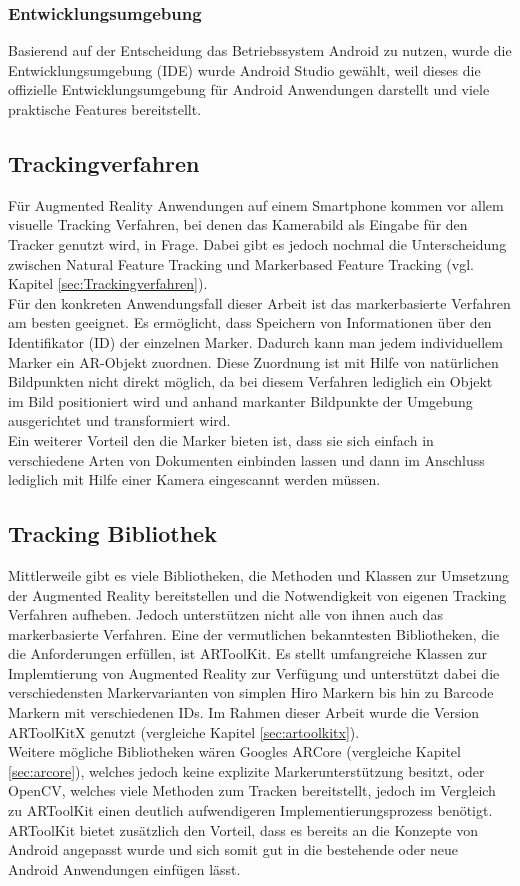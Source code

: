 \subsubsection{Entwicklungsumgebung}
Basierend auf der Entscheidung das Betriebssystem Android zu nutzen, wurde die Entwicklungsumgebung (IDE) wurde Android Studio gewählt, weil dieses die offizielle Entwicklungsumgebung für Android Anwendungen darstellt und viele praktische Features bereitstellt. 

\subsection{Trackingverfahren}
Für Augmented Reality Anwendungen auf einem Smartphone kommen vor allem visuelle Tracking Verfahren, bei denen das Kamerabild als Eingabe für den Tracker genutzt wird, in Frage. Dabei gibt es jedoch nochmal die Unterscheidung zwischen Natural Feature Tracking und Markerbased Feature Tracking (vgl. Kapitel \ref{sec:Trackingverfahren}). \\ 
Für den konkreten Anwendungsfall dieser Arbeit ist das markerbasierte Verfahren am besten geeignet. Es ermöglicht, dass Speichern von Informationen über den Identifikator (ID) der einzelnen Marker. Dadurch kann man jedem individuellem Marker ein AR-Objekt zuordnen. Diese Zuordnung ist mit Hilfe von natürlichen Bildpunkten nicht direkt möglich, da bei diesem Verfahren lediglich ein Objekt im Bild positioniert wird und anhand markanter Bildpunkte der Umgebung ausgerichtet und transformiert wird. \\
Ein weiterer Vorteil den die Marker bieten ist, dass sie sich einfach in verschiedene Arten von Dokumenten einbinden lassen und dann im Anschluss lediglich mit Hilfe einer Kamera eingescannt werden müssen. 

\subsection{Tracking Bibliothek}
Mittlerweile gibt es viele Bibliotheken, die Methoden und Klassen zur Umsetzung der Augmented Reality bereitstellen und die Notwendigkeit von eigenen Tracking Verfahren aufheben. Jedoch unterstützen nicht alle von ihnen auch das markerbasierte Verfahren. Eine der vermutlichen bekanntesten Bibliotheken, die die Anforderungen erfüllen, ist ARToolKit. Es stellt umfangreiche Klassen zur Implemtierung von Augmented Reality zur Verfügung und unterstützt dabei die verschiedensten Markervarianten von simplen Hiro Markern bis hin zu Barcode Markern mit verschiedenen IDs.
Im Rahmen dieser Arbeit wurde die Version ARToolKitX genutzt (vergleiche Kapitel \ref{sec:artoolkitx}). \\
Weitere mögliche Bibliotheken wären Googles ARCore (vergleiche Kapitel \ref{sec:arcore}), welches jedoch keine explizite Markerunterstützung besitzt, oder OpenCV, welches viele Methoden zum Tracken bereitstellt, jedoch im Vergleich zu ARToolKit einen deutlich aufwendigeren Implementierungsprozess benötigt. ARToolKit bietet zusätzlich den Vorteil, dass es bereits an die Konzepte von Android angepasst wurde und sich somit gut in die bestehende oder neue Android Anwendungen einfügen lässt.


